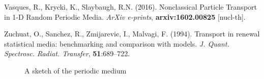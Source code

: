 \documentclass[12pt]{article}
\begin{document}
\begin{thebibliography}{}
Vasques, R., Krycki, K., Slaybaugh, R.N. (2016). Nonclassical Particle Transport in 1-D Random Periodic Media. {\it ArXiv e-prints}, {\bf arxiv:1602.00825} [nucl-th].

Zuchuat, O., Sanchez, R., Zmijarevic, I., Malvagi, F. (1994). Transport in renewal statistical media: benchmarking and comparison with models. {\it J. Quant. Spectrosc. Radiat. Transfer}, {\bf 51}:689--722.

\end{thebibliography}

\pagebreak

\begin{figure}[htb]
  \centering
  \caption{A sketch of the periodic medium}
  \label{fig1}
\end{figure}
\end{document}
